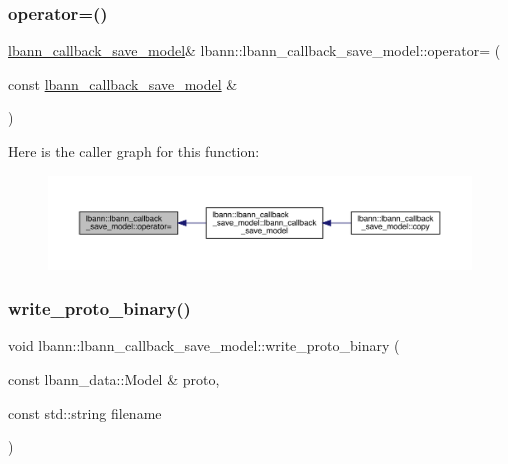 \subsubsection{\texorpdfstring{operator=()}{operator=()}}
{\footnotesize\ttfamily \hyperlink{classlbann_1_1lbann__callback__save__model}{lbann\+\_\+callback\+\_\+save\+\_\+model}\& lbann\+::lbann\+\_\+callback\+\_\+save\+\_\+model\+::operator= (\begin{DoxyParamCaption}\item[{const \hyperlink{classlbann_1_1lbann__callback__save__model}{lbann\+\_\+callback\+\_\+save\+\_\+model} \&}]{ }\end{DoxyParamCaption})\hspace{0.3cm}{\ttfamily [default]}}

Here is the caller graph for this function\+:\nopagebreak
\begin{figure}[H]
\begin{center}
\leavevmode
\includegraphics[width=350pt]{classlbann_1_1lbann__callback__save__model_a606ca0b8144e6cedc96311d9e74c04b7_icgraph}
\end{center}
\end{figure}
\mbox{\label{classlbann_1_1lbann__callback__save__model_a3c06fcc91890d4fe51a07672152b91a5}} 
\subsubsection{\texorpdfstring{write\+\_\+proto\+\_\+binary()}{write\_proto\_binary()}}
{\footnotesize\ttfamily void lbann\+::lbann\+\_\+callback\+\_\+save\+\_\+model\+::write\+\_\+proto\+\_\+binary (\begin{DoxyParamCaption}\item[{const lbann\+\_\+data\+::\+Model \&}]{proto,  }\item[{const std\+::string}]{filename }\end{DoxyParamCaption})\hspace{0.3cm}{\ttfamily [private]}}



